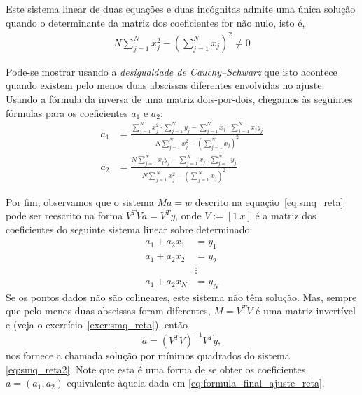Este sistema linear de duas equações e duas incógnitas admite uma única solução quando o determinante da matriz dos coeficientes for não nulo, isto é,  
\begin{eqnarray*}
N \sum_{j=1}^N x_j^2 - \left(\sum_{j=1}^N x_j\right)^2 \neq 0 
\end{eqnarray*}

Pode-se mostrar usando a \emph{desigualdade de Cauchy–Schwarz} que isto acontece quando existem pelo menos duas abscissas diferentes envolvidas no ajuste.  Usando a fórmula da inversa de uma matriz dois-por-dois, chegamos às seguintes fórmulas para os coeficientes $a_1$ e $a_2$:
  \begin{equation}\label{eq:formula_final_ajuste_reta}
    \begin{split}
    a_1 &= \frac{\sum_{j=1}^N x_j^2  \cdot \sum_{j=1}^N y_j - \sum_{j=1}^N x_j \cdot \sum_{j=1}^N x_jy_j}{N \sum_{j=1}^N x_j^2 - \left(\sum_{j=1}^N x_j\right)^2}\\
    a_2 &= \frac{N \sum_{j=1}^N x_jy_j - \sum_{j=1}^N x_j  \cdot \sum_{j=1}^N y_j }{N \sum_{j=1}^N x_j^2 - \left(\sum_{j=1}^N x_j\right)^2}      
    \end{split}
\end{equation}

Por fim, observamos que o sistema $Ma = w$ descrito na equação~\eqref{eq:smq_reta} pode ser reescrito na forma $V^TVa = V^Ty$, onde $V := [1~x]$ é a matriz dos coeficientes do seguinte sistema linear sobre determinado:
\begin{equation}\label{eq:smq_reta2}
  \begin{split}
  a_1 + a_2x_1 &= y_1\\
  a_1 + a_2x_2 &= y_2\\
  &\vdots\\
  a_1 + a_2x_N &= y_N
  \end{split}
\end{equation}
Se os pontos dados não são colineares, este sistema não têm solução. Mas, sempre que pelo menos duas abscissas foram diferentes, $M = V^TV$ é uma matriz invertível e (veja o exercício~\ref{exer:smq_reta}), então
\begin{equation}\label{eq:sol_smq_reta}
  a = \left(V^TV\right)^{-1}V^Ty,
\end{equation}
nos fornece a chamada solução por mínimos quadrados do sistema \eqref{eq:smq_reta2}. Note que esta é uma forma de se obter os coeficientes $a = (a_1, a_2)$ equivalente àquela dada em \eqref{eq:formula_final_ajuste_reta}.


